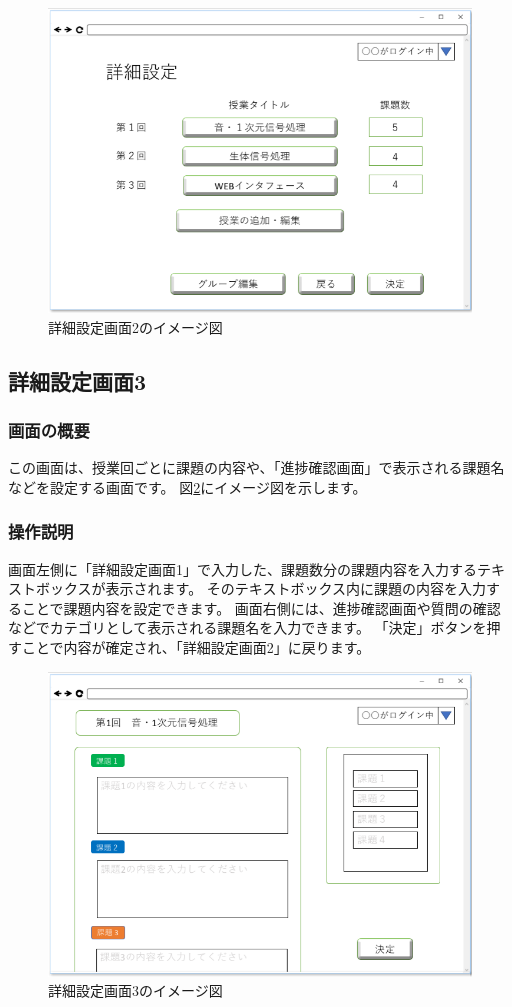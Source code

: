 \begin{figure}[htbp]
  \begin{center}
    \includegraphics[width=0.7\linewidth,clip]{./img/12.png}
    \caption{詳細設定画面2のイメージ図}\label{fig:12}
  \end{center}
\end{figure}

\newpage

\subsection{詳細設定画面3}
\subsubsection{画面の概要}
この画面は、授業回ごとに課題の内容や、「進捗確認画面」で表示される課題名などを設定する画面です。
図\ref{fig:13}にイメージ図を示します。

\subsubsection{操作説明}
画面左側に「詳細設定画面1」で入力した、課題数分の課題内容を入力するテキストボックスが表示されます。
そのテキストボックス内に課題の内容を入力することで課題内容を設定できます。
画面右側には、進捗確認画面や質問の確認などでカテゴリとして表示される課題名を入力できます。
「決定」ボタンを押すことで内容が確定され、「詳細設定画面2」に戻ります。

\begin{figure}[htbp]
  \begin{center}
    \includegraphics[width=0.7\linewidth,clip]{./img/13.png}
    \caption{詳細設定画面3のイメージ図}\label{fig:13}
  \end{center}
\end{figure}

